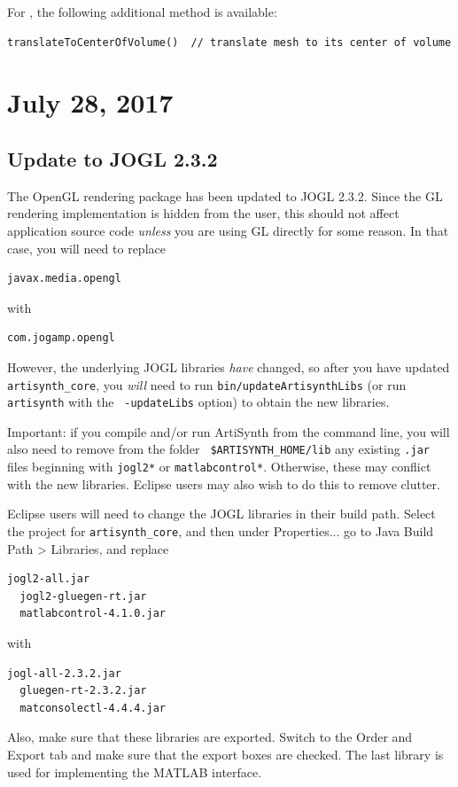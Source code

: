 \documentclass{article}
\begin{document}
For , the following
additional method is available:
%
\begin{lstlisting}[]
   translateToCenterOfVolume()  // translate mesh to its center of volume
\end{lstlisting}
%

\section*{July 28, 2017}

\subsection*{Update to JOGL 2.3.2}

The OpenGL rendering package has been updated to JOGL 2.3.2. Since the
GL rendering implementation is hidden from the user, this should not
affect application source code {\it unless} you are using GL directly
for some reason. In that case, you will need to replace
%
\begin{lstlisting}[]
  javax.media.opengl
\end{lstlisting}
%
with
%
\begin{lstlisting}[]
  com.jogamp.opengl
\end{lstlisting}
%
However, the underlying JOGL libraries {\it have} changed, so after
you have updated {\tt artisynth\_core}, you {\it will} need to run
{\tt bin/updateArtisynthLibs} (or run {\tt artisynth} with the {\tt
-updateLibs} option) to obtain the new libraries.

\begin{sideblock}
Important: if you compile and/or run ArtiSynth from the command line,
you will also need to remove from the folder {\tt
\$ARTISYNTH\_HOME/lib} any existing {\tt .jar} files beginning
with {\tt jogl2*} or {\tt matlabcontrol*}. Otherwise, these may
conflict with the new libraries. Eclipse users may also wish to do this
to remove clutter.
\end{sideblock}

Eclipse users will need to change the JOGL libraries in their
build path. Select the project for {\tt artisynth\_core}, and then
under {\sf Properties...} go to {\sf Java Build Path > Libraries}, and
replace
%
\begin{lstlisting}[]
  jogl2-all.jar
  jogl2-gluegen-rt.jar
  matlabcontrol-4.1.0.jar
\end{lstlisting}
%
with
%
\begin{lstlisting}[]
  jogl-all-2.3.2.jar
  gluegen-rt-2.3.2.jar
  matconsolectl-4.4.4.jar
\end{lstlisting}
%
Also, make sure that these libraries are exported. Switch to the {\sf
Order and Export} tab and make sure that the export boxes are checked.
The last library is used for implementing the MATLAB interface.
\end{document}
